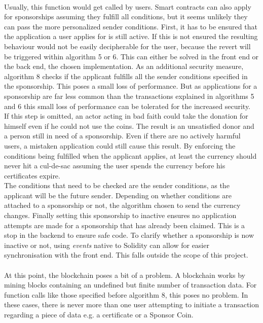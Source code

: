 \\
Usually, this function would get called by users. Smart contracts can also apply for sponsorships assuming they fulfill all conditions, but it seems unlikely they can pass the more personalized sender conditions. First, it has to be ensured that the application a user applies for is still active. If this is not ensured the resulting behaviour would not be easily decipherable for the user, because the revert will be triggered within algorithm 5 or 6. This can either be solved in the front end or the back end, the chosen implementation. As an additional security measure, algorithm 8 checks if the applicant fulfills all the sender conditions specified in the sponsorship. This poses a small loss of performance. But as applications for a sponsorship are far less common than the transactions explained in algorithms 5 and 6 this small loss of performance can be tolerated for the increased security.\\
If this step is omitted, an actor acting in bad faith could take the donation for himself even if he could not use the coins. The result is an unsatisfied donor and a person still in need of a sponsorship. Even if there are no actively harmful users, a mistaken application could still cause this result. By enforcing the conditions being fulfilled when the applicant applies, at least the currency should never hit a cul-de-sac assuming the user spends the currency before his certificates expire.\\
The conditions that need to be checked are the sender conditions, as the applicant will be the future sender. Depending on whether conditions are attached to a sponsorship or not, the algorithm chosen to send the currency changes. Finally setting this sponsorship to inactive ensures no application attempts are made for a sponsorship that has already been claimed. This is a stop in the backend to ensure safe code. To clarify whether a sponsorship is now inactive or not, using \emph{events} native to Solidity can allow for easier synchronisation with the front end. This falls outside the scope of this project.\\
\\
At this point, the blockchain poses a bit of a problem. A blockchain works by mining blocks containing an undefined but finite number of transaction data. For function calls like those specified before algorithm 8, this poses no problem. In these cases, there is never more than one user attempting to initiate a transaction regarding a piece of data e.g. a certificate or a Sponsor Coin.\\
